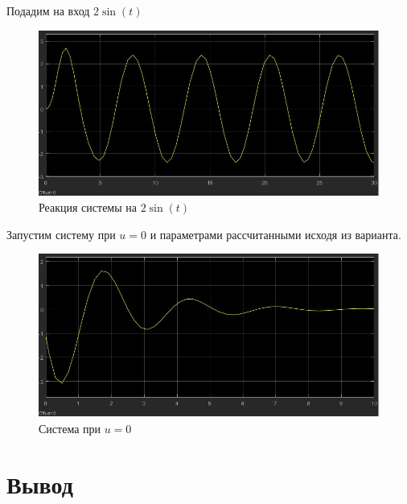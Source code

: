 \documentclass[a4paper, 12pt]{article}
\begin{document}
        \newpage
        Подадим на вход $2\sin(t)$
        \begin{figure}[H]
            \centering
            \includegraphics[scale=0.4]{2.2.jpg}
            \captionsetup{skip=0pt}
            \caption{Реакция системы на $2\sin(t)$}
            \label{fig:5imspdf}
        \end{figure}
        Запустим систему при $u = 0$ и параметрами рассчитанными исходя из варианта.
        \begin{figure}[H]
            \centering
            \includegraphics[scale=0.4]{2.3.jpg}
            \captionsetup{skip=0pt}
            \caption{Система при $u = 0$}
            \label{fig:5imspdf}
        \end{figure}
        \section{Вывод}
\end{document}
